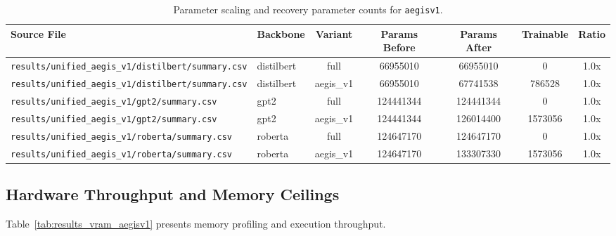 \begin{table}[t]
\centering
\small
\begin{tabular}{llccccc}
\toprule
\textbf{Source File} & \textbf{Backbone} & \textbf{Variant} & \textbf{Params Before} & \textbf{Params After} & \textbf{Trainable} & \textbf{Ratio} \\
\midrule
\texttt{results/unified\_aegis\_v1/distilbert/summary.csv} & distilbert & full & 66955010 & 66955010 & 0 & 1.0x \\
\texttt{results/unified\_aegis\_v1/distilbert/summary.csv} & distilbert & aegis\_v1 & 66955010 & 67741538 & 786528 & 1.0x \\
\texttt{results/unified\_aegis\_v1/gpt2/summary.csv} & gpt2 & full & 124441344 & 124441344 & 0 & 1.0x \\
\texttt{results/unified\_aegis\_v1/gpt2/summary.csv} & gpt2 & aegis\_v1 & 124441344 & 126014400 & 1573056 & 1.0x \\
\texttt{results/unified\_aegis\_v1/roberta/summary.csv} & roberta & full & 124647170 & 124647170 & 0 & 1.0x \\
\texttt{results/unified\_aegis\_v1/roberta/summary.csv} & roberta & aegis\_v1 & 124647170 & 133307330 & 1573056 & 1.0x \\
\bottomrule
\end{tabular}
\caption{Parameter scaling and recovery parameter counts for \texttt{aegisv1}.}
\label{tab:results_params_aegisv1}
\end{table}

\subsection{Hardware Throughput and Memory Ceilings}
Table~\ref{tab:results_vram_aegisv1} presents memory profiling and execution throughput.

